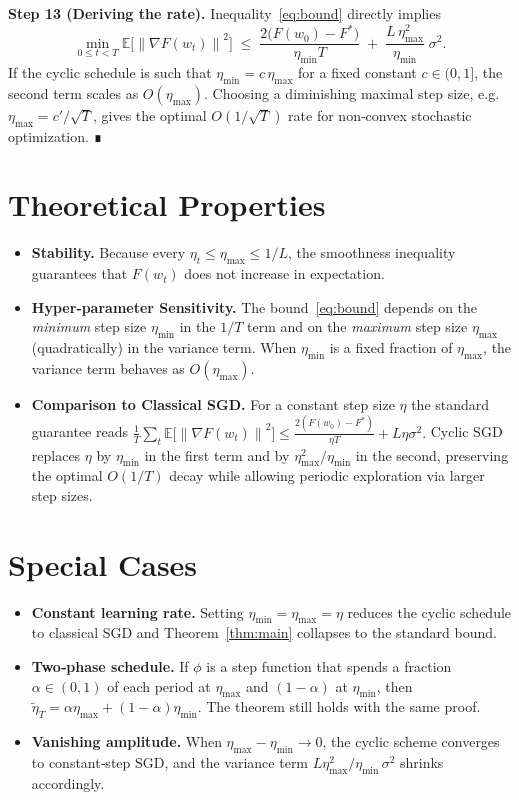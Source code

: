 \documentclass{article}
\newcommand{\E}{\mathbb{E}}
\newcommand{\norm}[1]{\left\|#1\right\|}
\begin{document}
\noindent\textbf{Step 13 (Deriving the rate).}  
Inequality~\eqref{eq:bound} directly implies
\[
\min_{0\le t<T}\E\!\big[\norm{\nabla F(w_{t})}^{2}\big]
\;\le\;
\frac{2\big(F(w_{0})-F^{*}\big)}{\eta_{\min}T}
\;+\;
\frac{L\,\eta_{\max}^{2}}{\eta_{\min}}\;\sigma^{2}.
\]
If the cyclic schedule is such that $\eta_{\min}=c\,\eta_{\max}$ for a fixed
constant $c\in(0,1]$, the second term scales as $O(\eta_{\max})$.
Choosing a diminishing maximal step size, e.g. $\eta_{\max}=c'/\sqrt{T}$,
gives the optimal $O(1/\sqrt{T})$ rate for non‑convex stochastic optimization. ∎

\section*{Theoretical Properties}
\begin{itemize}
\item \textbf{Stability.}  Because every $\eta_{t}\le\eta_{\max}\le 1/L$, the smoothness inequality guarantees that $F(w_{t})$ does not increase in expectation.
\item \textbf{Hyper‑parameter Sensitivity.}  The bound~\eqref{eq:bound} depends on the \emph{minimum} step size $\eta_{\min}$ in the $1/T$ term and on the \emph{maximum} step size $\eta_{\max}$ (quadratically) in the variance term.  When $\eta_{\min}$ is a fixed fraction of $\eta_{\max}$, the variance term behaves as $O(\eta_{\max})$.
\item \textbf{Comparison to Classical SGD.}  For a constant step size $\eta$ the standard guarantee reads 
\(
\frac{1}{T}\sum_{t}\E\!\big[\norm{\nabla F(w_{t})}^{2}\big]
\le \frac{2(F(w_{0})-F^{*})}{\eta T}+L\eta\sigma^{2}.
\)
Cyclic SGD replaces $\eta$ by $\eta_{\min}$ in the first term and by $\eta_{\max}^{2}/\eta_{\min}$ in the second, preserving the optimal $O(1/T)$ decay while allowing periodic exploration via larger step sizes.
\end{itemize}

\section*{Special Cases}
\begin{itemize}
\item \textbf{Constant learning rate.}  Setting $\eta_{\min}=\eta_{\max}=\eta$ reduces the cyclic schedule to classical SGD and Theorem~\ref{thm:main} collapses to the standard bound.
\item \textbf{Two‑phase schedule.}  If $\phi$ is a step function that spends a fraction $\alpha\in(0,1)$ of each period at $\eta_{\max}$ and $(1-\alpha)$ at $\eta_{\min}$, then $\tilde\eta_T=\alpha\eta_{\max}+(1-\alpha)\eta_{\min}$.  The theorem still holds with the same proof.
\item \textbf{Vanishing amplitude.}  When $\eta_{\max}-\eta_{\min}\to0$, the cyclic scheme converges to constant‑step SGD, and the variance term $L\eta_{\max}^{2}/\eta_{\min}\,\sigma^{2}$ shrinks accordingly.
\end{itemize}
\end{document}
